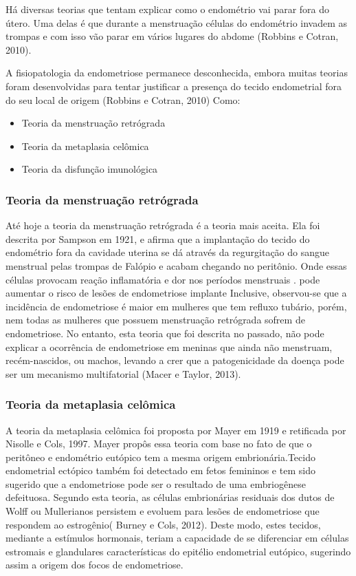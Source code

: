 \documentclass[12pt]{article} %
\begin{document}
Há diversas teorias que tentam explicar como o endométrio vai parar
fora do útero. Uma delas é que durante a menstruação células do
endométrio invadem as trompas e com isso vão parar em vários lugares
do abdome (Robbins e Cotran, 2010).


A fisiopatologia da endometriose permanece desconhecida, embora muitas
teorias foram desenvolvidas para tentar justificar a presença do
tecido endometrial fora do seu local de origem (Robbins e Cotran, 2010) Como:

\begin{itemize}
\item Teoria da menstruação retrógrada
\item Teoria da metaplasia celômica
\item Teoria da disfunção imunológica
\end{itemize}


\subsubsection{Teoria da menstruação retrógrada}

Até hoje a teoria da menstruação retrógrada é a teoria mais
aceita. Ela foi descrita por Sampson em 1921, e afirma que a
implantação do tecido do endométrio fora da cavidade uterina se dá
através da regurgitação do sangue menstrual pelas trompas de Falópio e
acabam chegando no peritônio. Onde essas células provocam reação
inflamatória e dor nos períodos menstruais . pode aumentar o risco de lesões de endometriose implante Inclusive, observou-se que
a incidência de endometriose é maior em mulheres que tem refluxo
tubário, porém, nem todas as mulheres que possuem menstruação
retrógrada sofrem de endometriose. No entanto, esta teoria que foi descrita no passado, não pode explicar a ocorrência de endometriose em meninas que ainda não menstruam, recém-nascidos, ou machos, levando a crer que a patogenicidade da doença pode ser um mecanismo multifatorial (Macer e Taylor, 2013).

\subsubsection{Teoria da metaplasia celômica}

A teoria da metaplasia celômica foi proposta por Mayer em 1919 e
retificada por Nisolle e Cols, 1997. Mayer propôs essa teoria com base
no fato de que o peritôneo e endométrio eutópico tem a mesma origem
embrionária.Tecido endometrial ectópico também foi detectado em fetos femininos e tem sido sugerido que a endometriose pode ser o resultado de uma embriogênese defeituosa. Segundo esta teoria, as células embrionárias residuais dos dutos de Wolff ou Mullerianos persistem e evoluem para lesões de endometriose que respondem ao estrogênio( Burney e Cols, 2012). Deste modo, estes tecidos, mediante a estímulos
hormonais, teriam a capacidade de se diferenciar em células estromais
e glandulares características do epitélio endometrial eutópico,
sugerindo assim a origem dos focos de endometriose.
\end{document}
